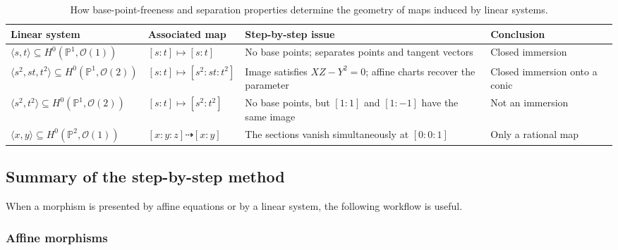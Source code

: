 \documentclass[12pt,a4paper]{article}
\theoremstyle{notespace}
\begin{document}
\begin{table}[htbp]
	\centering
	\renewcommand{\arraystretch}{1.45}
	\begin{tabular}{
			|>{\raggedright\arraybackslash}p{3.3cm}
			|>{\raggedright\arraybackslash}p{4.3cm}
			|>{\raggedright\arraybackslash}p{4.6cm}
			|>{\raggedright\arraybackslash}p{3.6cm}|
		}
		\hline
		\textbf{Linear system}
		&
		\textbf{Associated map}
		&
		\textbf{Step-by-step issue}
		&
		\textbf{Conclusion}
		\\
		\hline
		
		\(\langle s,t\rangle\subseteq H^{0}(\mathbb{P}^{1},\mathcal{O}(1))\)
		&
		\([s:t]\mapsto [s:t]\)
		&
		No base points; separates points and tangent vectors
		&
		Closed immersion
		\\
		\hline
		
		\(\langle s^{2},st,t^{2}\rangle\subseteq H^{0}(\mathbb{P}^{1},\mathcal{O}(2))\)
		&
		\([s:t]\mapsto [s^{2}:st:t^{2}]\)
		&
		Image satisfies \(XZ-Y^{2}=0\); affine charts recover the parameter
		&
		Closed immersion onto a conic
		\\
		\hline
		
		\(\langle s^{2},t^{2}\rangle\subseteq H^{0}(\mathbb{P}^{1},\mathcal{O}(2))\)
		&
		\([s:t]\mapsto [s^{2}:t^{2}]\)
		&
		No base points, but \([1:1]\) and \([1:-1]\) have the same image
		&
		Not an immersion
		\\
		\hline
		
		\(\langle x,y\rangle\subseteq H^{0}(\mathbb{P}^{2},\mathcal{O}(1))\)
		&
		\([x:y:z]\dashrightarrow [x:y]\)
		&
		The sections vanish simultaneously at \([0:0:1]\)
		&
		Only a rational map
		\\
		\hline
	\end{tabular}
	\caption{How base-point-freeness and separation properties determine the geometry of maps induced by linear systems.}
	\label{tab:linear-systems-immersions}
\end{table}

\subsection{Summary of the step-by-step method}

When a morphism is presented by affine equations or by a linear system, the following workflow is useful.

\subsubsection{Affine morphisms}
\end{document}
